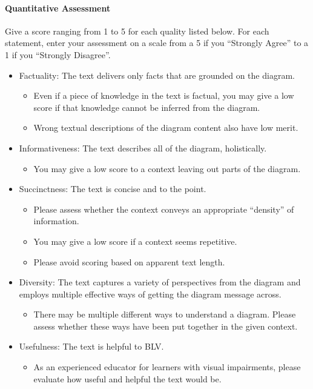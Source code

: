 \centering
\begin{tcolorbox}[
    colback=white,
    colframe=gray!20,
    arc=10pt,
    boxrule=1pt,
    title={\textcolor{white}{\textbf{Evaluation Guidelines for the \textcolor{lime}{Sighted Educator} Group (2/2)}}},
    coltitle=white,
    fonttitle=\large,
    colbacktitle=black!70,
]


\paragraph{Quantitative Assessment}

Give a score ranging from 1 to 5 for each quality listed below. For each statement, enter your assessment on a scale from a 5 if you ``Strongly Agree'' to a 1 if you ``Strongly Disagree''.

\begin{itemize}
    \item Factuality: The text delivers only facts that are grounded on the diagram.
    \begin{itemize}
        \item Even if a piece of knowledge in the text is factual, you may give a low score if that knowledge cannot be inferred from the diagram.
        \item Wrong textual descriptions of the diagram content also have low merit.
    \end{itemize}
    \item Informativeness: The text describes all of the diagram, holistically.
    \begin{itemize}
        \item You may give a low score to a context leaving out parts of the diagram.
    \end{itemize}
    \item Succinctness: The text is concise and to the point.
    \begin{itemize}
        \item Please assess whether the context conveys an appropriate ``density'' of information.
        \item You may give a low score if a context seems repetitive.
        \item Please avoid scoring based on apparent text length.
    \end{itemize}
    \item Diversity: The text captures a variety of perspectives from the diagram and employs multiple effective ways of getting the diagram message across.
    \begin{itemize}
        \item There may be multiple different ways to understand a diagram. Please assess whether these ways have been put together in the given context.
    \end{itemize}
    \item Usefulness: The text is helpful to BLV.
    \begin{itemize}
        \item As an experienced educator for learners with visual impairments, please evaluate how useful and helpful the text would be.
    \end{itemize}
\end{itemize}


\end{tcolorbox}
